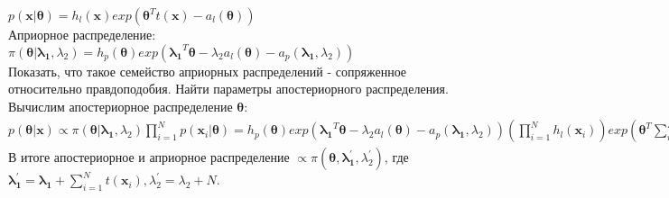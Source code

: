 \documentclass{article}
\begin{document}
$p(\mathbf{x}|\boldsymbol{\theta}) = h_{l}(\mathbf{x})exp(\boldsymbol{\theta}^{T} t(\mathbf{x}) - a_l(\boldsymbol{\theta}))$\\
Априорное распределение:\\
$\pi(\boldsymbol{\theta}|\boldsymbol{\lambda_1},\lambda_2) = h_p(\boldsymbol{\theta})exp(\boldsymbol{\lambda_1}^{T}\boldsymbol{\theta} - \lambda_2a_l(\boldsymbol{\theta}) - a_p(\boldsymbol{\lambda_1}, \lambda_2))$\\
Показать, что такое семейство априорных распределений - сопряженное относительно правдоподобия. Найти параметры апостериорного распределения.\\
Вычислим апостериорное распределение $\boldsymbol{\theta}$:\\
$p(\boldsymbol{\theta}|\mathbf{x}) \propto \pi(\boldsymbol{\theta}|\boldsymbol{\lambda_1},\lambda_2)\prod_{i=1}^{N} p(\mathbf{x}_i|\boldsymbol{\theta}) = h_p(\boldsymbol{\theta})exp(\boldsymbol{\lambda_1}^T\boldsymbol{\theta} - \lambda_2a_l(\boldsymbol{\theta}) - a_p(\boldsymbol{\lambda_1},\lambda_2))(\prod_{i=1}^{N} h_l(\mathbf{x}_i))exp(\boldsymbol{\theta}^T\sum\limits_{i=1}^{N}t(\mathbf{x}_i) - Na_l(\boldsymbol{\theta})) \propto h_p(\boldsymbol{\theta})exp((\boldsymbol{\lambda_1} + \sum\limits_{i=1}^N t(\mathbf{x}_i))^T\boldsymbol{\theta} - (\lambda_2 + N)a_l(\boldsymbol{\theta}))$\\
В итоге апостериорное и априорное распределение $\propto \pi(\boldsymbol{\theta},\boldsymbol{\lambda_1^{'}},\lambda_2^{'})$, где $\boldsymbol{\lambda_1^{'}} = \boldsymbol{\lambda_1} + \sum\limits_{i=1}^{N} t(\mathbf{x}_i), \lambda_2^{'} = \lambda_2 + N$.
\end{document}
